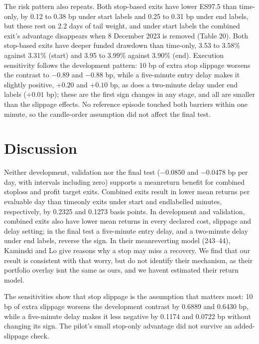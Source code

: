 \documentclass[11pt,a4paper]{article}
\begin{document}
The risk pattern also repeats. Both stop-based exits have lower ES97.5 than time-only, by 0.12 to 0.38 bp under start labels and 0.25 to 0.31 bp under end labels, but these rest on 2.2 days of tail weight, and under start labels the combined exit's advantage disappears when 8 December 2023 is removed (Table 20). Both stop-based exits have deeper funded drawdown than time-only, 3.53 to 3.58\% against 3.31\% (start) and 3.95 to 3.99\% against 3.90\% (end). Execution sensitivity follows the development pattern: 10 bp of extra stop slippage worsens the contrast to $-0.89$ and $-0.88$ bp, while a five-minute entry delay makes it slightly positive, $+0.20$ and $+0.10$ bp, as does a two-minute delay under end labels ($+0.01$ bp); these are the first sign changes in any stage, and all are smaller than the slippage effects. No reference episode touched both barriers within one minute, so the candle-order assumption did not affect the final test.

\section*{Discussion}

Neither development, validation nor the final test ($-0.0850$ and $-0.0478$ bp per day, with intervals including zero) supports a mean\allowbreak{}return benefit for combined stop\allowbreak{}loss and profit target exits. Combined exits result in lower mean returns per evaluable day than time\allowbreak{}only exits under start\allowbreak{} and end\allowbreak{}labelled minutes, respectively, by 0.2325 and 0.1273 basis points. In development and validation, combined exits also have lower mean returns in every declared cost, slippage and delay setting; in the final test a five-minute entry delay, and a two-minute delay under end labels, reverse the sign. In their mean\allowbreak{}reverting model (243–44), Kaminski and Lo give reasons why a stop may miss a recovery. We find that our result is consistent with that worry, but do not identify their mechanism, as their portfolio overlay isnt the same as ours, and we havent estimated their return model.

The sensitivities show that stop slippage is the assumption that matters most: 10 bp of extra slippage worsens the development contrast by 0.6889 and 0.6430 bp, while a five-minute delay makes it less negative by 0.1174 and 0.0722 bp without changing its sign. The pilot's small stop-only advantage did not survive an added-slippage check.
\end{document}
